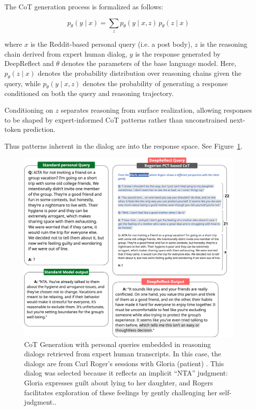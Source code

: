 The CoT generation process is formalized as follows:

\[
p_\theta(y \mid x) = \sum_{z} p_\theta(y \mid x, z) \, p_\theta(z \mid x)
\]

where $x$ is the Reddit-based personal query (i.e. a post body), $z$ is the reasoning chain derived from expert human dialog, $y$ is the response generated by DeepReflect and $\theta$ denotes the parameters of the base language model. Here, $p_\theta(z \mid x)$ denotes the probability distribution over reasoning chains given the query, while $p_\theta(y \mid x, z)$ denotes the probability of generating a response conditioned on both the query and reasoning trajectory. 

Conditioning on $z$ separates reasoning from surface realization, allowing responses to be shaped by expert-informed CoT patterns rather than unconstrained next-token prediction.

Thus patterns inherent in the dialog are into the response space. See Figure~\ref{fig:rogers_diagram}.

\begin{figure}[h!]
    \centering
    \includegraphics[width=0.98\columnwidth]{Diagrams/Rogers.png}
    \caption{CoT Generation with personal queries embedded in reasoning dialogs retrieved from expert human transcripts. In this case, the dialogs are from Carl Roger's sessions with Gloria (patient) \cite{rogersgloria}. This dialog was selected because it reflects an implicit “NTA” judgment: Gloria expresses guilt about lying to her daughter, and Rogers facilitates exploration of these feelings by gently challenging her self-judgment..}
    \label{fig:rogers_diagram}
\end{figure}


